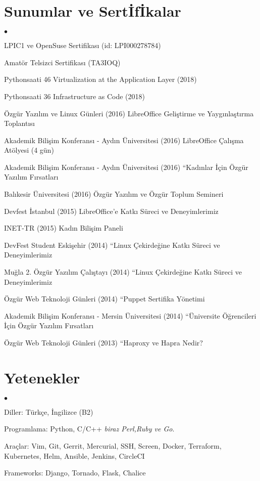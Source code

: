 \documentclass[margin,line]{res}
\newenvironment{list2}{
  \begin{list}{$\bullet$}{%
      \setlength{\itemsep}{0in}
      \setlength{\parsep}{0in} \setlength{\parskip}{0in}
      \setlength{\topsep}{0in} \setlength{\partopsep}{0in}
      \setlength{\leftmargin}{0.1in}}}{\end{list}}
\begin{document}
\begin{resume}
\section{\sc Sunumlar ve Sert\.{I}f\.{I}kalar}
\begin{list2}
\item LPIC1 ve OpenSuse Sertifikas{\i} (id: LPI000278784)
\item Amat\"{o}r Telsizci Sertifikas{\i} (TA3IOQ)
\item Pythonsaati 46 Virtualization at the Application Layer (2018)
\item Pythonsaati 36 Infrastructure as Code (2018)
\item \"{O}zg\"{u}r Yaz{\i}l{\i}m ve Linux G\"{u}nleri (2016) 	LibreOffice Geli\c{s}tirme ve Yayg{\i}nla\c{s}t{\i}rma Toplant{\i}s{\i}
\item Akademik Bili\c{s}im Konferans{\i} - Ayd{\i}n \"{U}niversitesi (2016) LibreOffice \c{C}al{\i}\c{s}ma At\"{o}lyesi (4 g\"{u}n)
\item Akademik Bili\c{s}im Konferans{\i} - Ayd{\i}n \"{U}niversitesi (2016) “Kad{\i}nlar \.{I}\c{c}in \"{O}zg\"{u}r Yaz{\i}l{\i}m F{\i}rsatlar{\i}
\item Bal{\i}kesir \"{U}niversitesi (2016) \"{O}zg\"{u}r Yaz{\i}l{\i}m ve \"{O}zg\"{u}r Toplum Semineri
\item Devfest \.{I}stanbul (2015) LibreOffice'e Katk{\i} S\"{u}reci ve Deneyimlerimiz
\item INET-TR (2015) Kad{\i}n Bili\c{s}im Paneli 
\item DevFest Student Eski\c{s}ehir (2014) “Linux \c{C}ekirde\u{g}ine Katk{\i} S\"{u}reci ve Deneyimlerimiz
\item Mu\u{g}la 2. \"{O}zg\"{u}r Yaz{\i}l{\i}m \c{C}al{\i}\c{s}tay{\i} (2014) “Linux \c{C}ekirde\u{g}ine Katk{\i} S\"{u}reci ve Deneyimlerimiz
\item \"{O}zg\"{u}r Web Teknoloji G\"{u}nleri (2014) “Puppet Sertifika Y\"{o}netimi
\item Akademik Bili\c{s}im Konferans{\i} - Mersin \"{U}niversitesi (2014) “\"{U}niversite \"{O}\u{g}rencileri \.{I}\c{c}in \"{O}zg\"{u}r Yaz{\i}l{\i}m F{\i}rsatlar{\i}
\item \"{O}zg\"{u}r Web Teknoloji G\"{u}nleri (2013) “Haproxy ve Hapra Nedir?
\end{list2}
\vspace{-.3cm}

\section{\sc Yetenekler}
\begin{list2}
\item Diller: T\"{u}rk\c{c}e, \.{I}ngilizce (B2)
\item Programlama: Python, C/C++ {\em biraz Perl,Ruby ve Go}.
\item Ara\c{c}lar: Vim, Git, Gerrit, Mercurial, SSH, Screen, Docker, Terraform, Kubernetes, Helm, Ansible, Jenkins, CircleCI
\item Frameworks: Django, Tornado, Flask, Chalice
\end{list2}


\end{resume}
\end{document}
